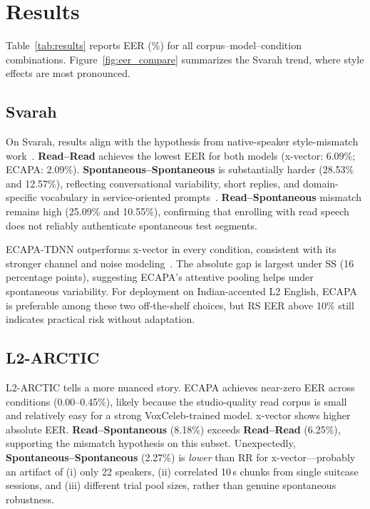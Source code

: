 \documentclass[cameraready]{Interspeech}
\begin{document}
\section{Results}
\label{sec:results}

Table~\ref{tab:results} reports EER (\%) for all corpus--model--condition combinations. Figure~\ref{fig:eer_compare} summarizes the Svarah trend, where style effects are most pronounced.

\subsection{Svarah}

On Svarah, results align with the hypothesis from native-speaker style-mismatch work~\cite{tom2010style,wang2020crossstyle}. \textbf{Read--Read} achieves the lowest EER for both models (x-vector: 6.09\%; ECAPA: 2.09\%). \textbf{Spontaneous--Spontaneous} is substantially harder (28.53\% and 12.57\%), reflecting conversational variability, short replies, and domain-specific vocabulary in service-oriented prompts~\cite{javed2023svarah}. \textbf{Read--Spontaneous} mismatch remains high (25.09\% and 10.55\%), confirming that enrolling with read speech does not reliably authenticate spontaneous test segments.

ECAPA-TDNN outperforms x-vector in every condition, consistent with its stronger channel and noise modeling~\cite{desplanques2020ecapa}. The absolute gap is largest under SS (16 percentage points), suggesting ECAPA's attentive pooling helps under spontaneous variability. For deployment on Indian-accented L2 English, ECAPA is preferable among these two off-the-shelf choices, but RS EER above 10\% still indicates practical risk without adaptation.

\subsection{L2-ARCTIC}

L2-ARCTIC tells a more nuanced story. ECAPA achieves near-zero EER across conditions (0.00--0.45\%), likely because the studio-quality read corpus is small and relatively easy for a strong VoxCeleb-trained model. x-vector shows higher absolute EER. \textbf{Read--Spontaneous} (8.18\%) exceeds \textbf{Read--Read} (6.25\%), supporting the mismatch hypothesis on this subset. Unexpectedly, \textbf{Spontaneous--Spontaneous} (2.27\%) is \emph{lower} than RR for x-vector---probably an artifact of (i) only 22 speakers, (ii) correlated 10\,s chunks from single suitcase sessions, and (iii) different trial pool sizes, rather than genuine spontaneous robustness.
\end{document}
